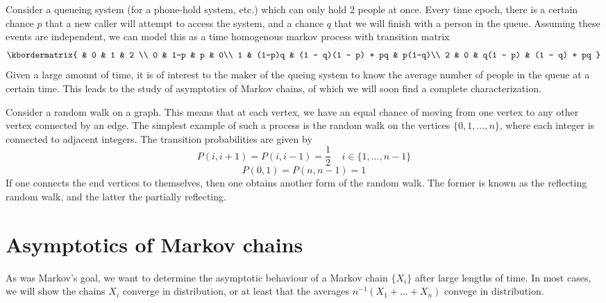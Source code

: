 \begin{example}
    Consider a queueing system (for a phone-hold system, etc.) which can only hold 2 people at once. Every time epoch, there is a certain chance $p$ that a new caller will attempt to access the system, and a chance $q$ that we will finish with a person in the queue. Assuming these events are independent, we can model this as a time homogenous markov process with transition matrix
    \[ \kbordermatrix{
    & 0 & 1 & 2 \\
    0 & 1-p & p & 0\\
    1 & (1-p)q & (1 - q)(1 - p) + pq & p(1-q)\\
    2 & 0 & q(1 - p) & (1 - q) + pq }
    \]
    Given a large amount of time, it is of interest to the maker of the queing system to know the average number of people in the queue at a certain time. This leads to the study of asymptotics of Markov chains, of which we will soon find a complete characterization.
\end{example}

\begin{example}
    Consider a random walk on a graph. This means that at each vertex, we have an equal chance of moving from one vertex to any other vertex connected by an edge. The simplest example of such a process is the random walk on the vertices $\{ 0, 1, \dots, n\}$, where each integer is connected to adjacent integers. The transition probabilities are given by
    \[ P(i,i+1) = P(i,i-1) = \frac{1}{2}\ \ \ \ \ i \in \{1, \dots, n-1 \} \]
    \[ P(0,1) = P(n,n-1) = 1 \]
    If one connects the end vertices to themselves, then one obtains another form of the random walk. The former is known as the reflecting random walk, and the latter the partially reflecting.
\end{example}

\section{Asymptotics of Markov chains}

As was Markov's goal, we want to determine the asymptotic behaviour of a Markov chain $\{X_i\}$ after large lengths of time. In most cases, we will show the chains $X_i$ converge in distribution, or at least that the averages $n^{-1}(X_1 + \dots + X_n)$ convege in distribution.

